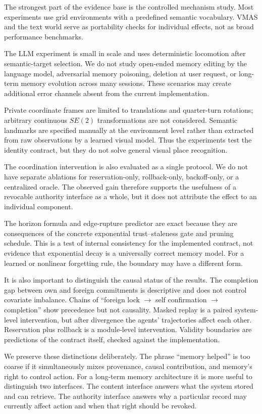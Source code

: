 \documentclass{article}
\begin{document}
The strongest part of the evidence base is the controlled mechanism study. Most experiments use grid environments with a predefined semantic vocabulary. VMAS and the text world serve as portability checks for individual effects, not as broad performance benchmarks.

The LLM experiment is small in scale and uses deterministic locomotion after semantic-target selection. We do not study open-ended memory editing by the language model, adversarial memory poisoning, deletion at user request, or long-term memory evolution across many sessions. These scenarios may create additional error channels absent from the current implementation.

Private coordinate frames are limited to translations and quarter-turn rotations; arbitrary continuous $SE(2)$ transformations are not considered. Semantic landmarks are specified manually at the environment level rather than extracted from raw observations by a learned visual model. Thus the experiments test the identity contract, but they do not solve general visual place recognition.

The coordination intervention is also evaluated as a single protocol. We do not have separate ablations for reservation-only, rollback-only, backoff-only, or a centralized oracle. The observed gain therefore supports the usefulness of a revocable authority interface as a whole, but it does not attribute the effect to an individual component.

The horizon formula and edge-rupture predictor are exact because they are consequences of the concrete exponential trust--staleness gate and pruning schedule. This is a test of internal consistency for the implemented contract, not evidence that exponential decay is a universally correct memory model. For a learned or nonlinear forgetting rule, the boundary may have a different form.

It is also important to distinguish the causal status of the results. The completion gap between own and foreign commitments is descriptive and does not control covariate imbalance. Chains of ``foreign lock $\to$ self confirmation $\to$ completion'' show precedence but not causality. Masked replay is a paired system-level intervention, but after divergence the agents' trajectories affect each other. Reservation plus rollback is a module-level intervention. Validity boundaries are predictions of the contract itself, checked against the implementation.

We preserve these distinctions deliberately. The phrase ``memory helped'' is too coarse if it simultaneously mixes provenance, causal contribution, and memory's right to control action. For a long-term memory architecture it is more useful to distinguish two interfaces. The content interface answers what the system stored and can retrieve. The authority interface answers why a particular record may currently affect action and when that right should be revoked.
\end{document}
